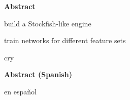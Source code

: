 \thispagestyle{plain}
\begin{center}
\large
\textbf{Abstract}
\end{center}

build a Stockfish-like engine

train networks for different feature sets

cry

\vspace{2cm}

\begin{center}
\large
\textbf{Abstract (Spanish)}
\end{center}

en español

\clearpage
